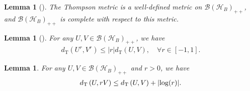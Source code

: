 \documentclass{article}
\newtheorem{lemma}[theorem]{Lemma}
\begin{document}
\begin{lemma}[{\cite[Lemma 3]{Thompson1963}}]
    \label{eq:ThompIsMetric}
    The Thompson metric is a well-defined metric on $\mathcal{B}\left(\mathcal{H}_B\right)_{++}$, and $\mathcal{B}\left(\mathcal{H}_B\right)_{++}$ is complete with respect to this metric.
\end{lemma}
\begin{lemma}[{\cite[Proposition 1.5]{Nussbaum1988}}]%
    \label{ineq:NegCurveProp}
    For any $U,V\in\mathcal{B}\left(\mathcal{H}_B\right)_{++}$, 
    we have
    \begin{align}
        d_{\mathrm{T}}(U^r,V^r)\leq |r|d_{\mathrm{T}}(U,V),\quad\forall r\in[-1,1].
    \end{align}
\end{lemma}

\begin{lemma}
    \label{ineq:ThompsonLogHomo}
    For any $U,V\in\mathcal{B}\left( \mathcal{H}_B\right)_{++}$ and $r>0$, we have
    \begin{align}
        d_{\mathrm{T}}\left(U,rV\right)
        \leq d_{\mathrm{T}}\left(U,V\right)+\abs{\log(r)}.
    \end{align}
\end{lemma}
\end{document}
